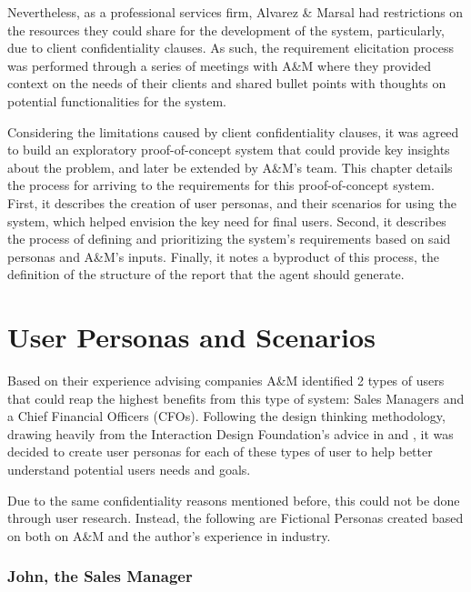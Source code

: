 \documentclass[a4paper]{report}
\begin{document}
Nevertheless, as a professional services firm, Alvarez \& Marsal had restrictions on the resources they could share for the development of the system, particularly, due to client confidentiality clauses. As such, the requirement elicitation process was performed through a series of meetings with A\&M where they provided context on the needs of their clients and shared bullet points with thoughts on potential functionalities for the system.

Considering the limitations caused by client confidentiality clauses, it was agreed to build an exploratory proof-of-concept system that could provide key insights about the problem, and later be extended by A\&M's team. This chapter details the process for arriving to the requirements for this proof-of-concept system. First, it describes the creation of user personas, and their scenarios for using the system, which helped envision the key need for final users. Second, it describes the process of defining and prioritizing the system's requirements based on said personas and A\&M's inputs. Finally, it notes a byproduct of this process, the definition of the structure of the report that the agent should generate.

\section{User Personas and Scenarios}

Based on their experience advising companies A\&M identified 2 types of users that could reap the highest benefits from this type of system: Sales Managers and a Chief Financial Officers (CFOs). Following the design thinking methodology, drawing heavily from the Interaction Design Foundation's advice in \cite{ixdf_personas_2025} and \cite{ixdf_user_scenarios_2025}, it was decided to create user personas for each of these types of user to help better understand potential users needs and goals.

Due to the same confidentiality reasons mentioned before, this could not be done through user research. Instead, the following are Fictional Personas created based on both on A\&M and the author's experience in industry.

\subsubsection{John, the Sales Manager}
\end{document}
